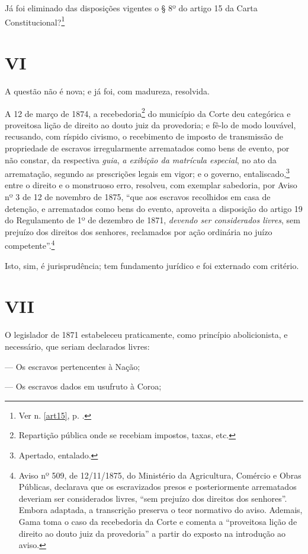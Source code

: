 {Já foi eliminado das disposições vigentes o § 8º do artigo 15 da Carta
Constitucional?\footnote{Ver n. \ref{art15}, p. \pageref{art15}.}

\section*{VI}

A questão não é nova; e já foi, com madureza, resolvida.

A 12 de março de 1874, a recebedoria\footnote{Repartição pública onde
  se recebiam impostos, taxas, etc.} do município da Corte deu
categórica e proveitosa lição de direito ao douto juiz da provedoria; e
fê-lo de modo louvável, recusando, com ríspido civismo, o recebimento de
imposto de transmissão de propriedade de escravos irregularmente
arrematados como bens de evento, por não constar, da respectiva
\emph{guia}, \emph{a exibição da matrícula especial}, no ato da
arrematação, segundo as prescrições legais em vigor; e o governo,
entaliscado,\footnote{Apertado, entalado.} entre o direito e o
monstruoso erro, resolveu, com exemplar sabedoria, por Aviso nº 3 de 12
de novembro de 1875, ``que aos escravos recolhidos em casa de detenção, e
arrematados como bens do evento, aproveita a disposição do artigo 19 do
Regulamento de 1º de dezembro de 1871, \emph{devendo ser considerados
livres}, sem prejuízo dos direitos dos senhores, reclamados por ação
ordinária no juízo competente''.\footnote{Aviso nº 509, de 12/11/1875,
  do Ministério da Agricultura, Comércio e Obras Públicas, declarava que
  os escravizados presos e posteriormente arrematados deveriam ser
  considerados livres, ``sem prejuízo dos direitos dos senhores''. Embora
  adaptada, a transcrição preserva o teor normativo do aviso. Ademais,
  Gama toma o caso da recebedoria da Corte e comenta a ``proveitosa lição
  de direito ao douto juiz da provedoria'' a partir do exposto na
  introdução ao aviso.}

Isto, sim, é jurisprudência; tem fundamento jurídico e foi externado com
critério.

\section*{VII}

O legislador de 1871 estabeleceu praticamente, como princípio
abolicionista, e necessário, que seriam declarados livres:

--- Os escravos pertencentes à Nação;

--- Os escravos dados em usufruto à Coroa;

}
